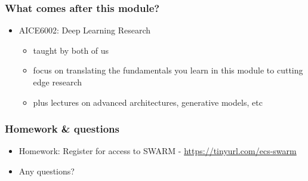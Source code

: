 \documentclass[]{article}
\begin{document}
\begin{frame}
	\frametitle{What comes after this module?}
	\begin{itemize}
		\item AICE6002: Deep Learning Research
		\begin{itemize}
			\item taught by both of us
			\item focus on translating the fundamentals you learn in this module to cutting edge research
			\item plus lectures on advanced architectures, generative models, etc
		\end{itemize}
	\end{itemize}
\end{frame}

\begin{frame}
	\frametitle{Homework \& questions}
	\begin{itemize}
		\item Homework: Register for access to SWARM - \url{https://tinyurl.com/ecs-swarm}
		\item Any questions?
	\end{itemize}
\end{frame}
\end{document}
